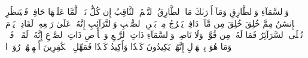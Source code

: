 وَٱلسَّمَآءِ وَٱلطَّارِقِ
وَمَآ أَدۡرَىٰكَ مَا ٱلطَّارِقُ
ٱلنَّجۡمُ ٱلثَّاقِبُ
إِن كُلُّ نَفۡسٖ لَّمَّا عَلَيۡهَا حَافِظٞ
فَلۡيَنظُرِ ٱلۡإِنسَٰنُ مِمَّ خُلِقَ
خُلِقَ مِن مَّآءٖ دَافِقٖ
يَخۡرُجُ مِنۢ بَيۡنِ ٱلصُّلۡبِ وَٱلتَّرَآئِبِ
إِنَّهُۥ عَلَىٰ رَجۡعِهِۦ لَقَادِرٞ
يَوۡمَ تُبۡلَى ٱلسَّرَآئِرُ
فَمَا لَهُۥ مِن قُوَّةٖ وَلَا نَاصِرٖ
وَٱلسَّمَآءِ ذَاتِ ٱلرَّجۡعِ
وَٱلۡأَرۡضِ ذَاتِ ٱلصَّدۡعِ
إِنَّهُۥ لَقَوۡلٞ فَصۡلٞ
وَمَا هُوَ بِٱلۡهَزۡلِ
إِنَّهُمۡ يَكِيدُونَ كَيۡدٗا
وَأَكِيدُ كَيۡدٗا
فَمَهِّلِ ٱلۡكَٰفِرِينَ أَمۡهِلۡهُمۡ رُوَيۡدَۢا